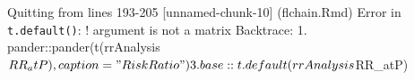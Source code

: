 \documentclass[
]{article}
\newenvironment{Shaded}{\begin{snugshade}}{\end{snugshade}}
\newcommand{\AttributeTok}[1]{\textcolor[rgb]{0.13,0.29,0.53}{#1}}
\newcommand{\FunctionTok}[1]{\textcolor[rgb]{0.13,0.29,0.53}{\textbf{#1}}}
\newcommand{\NormalTok}[1]{#1}
\newcommand{\SpecialCharTok}[1]{\textcolor[rgb]{0.81,0.36,0.00}{\textbf{#1}}}
\newcommand{\StringTok}[1]{\textcolor[rgb]{0.31,0.60,0.02}{#1}}
\begin{document}
\begin{Shaded}
\end{Shaded}

Quitting from lines 193-205 {[}unnamed-chunk-10{]} (flchain.Rmd) Error
in \texttt{t.default()}: ! argument is not a matrix Backtrace: 1.
pander::pander(t(rrAnalysis\(RR_atP), caption = "Risk Ratio")  3. base::t.default(rrAnalysis\)RR\_atP)

\begin{Shaded}
\end{Shaded}
\end{document}
